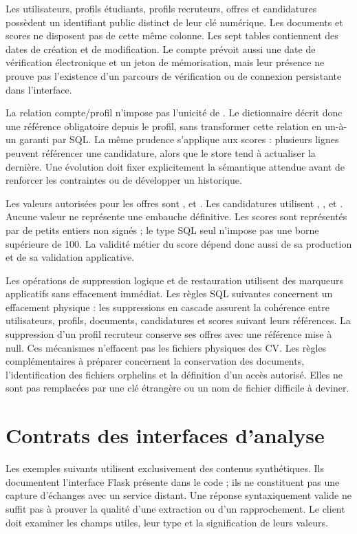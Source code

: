 Les utilisateurs, profils étudiants, profils recruteurs, offres et candidatures possèdent un identifiant public distinct de leur clé numérique. Les documents et scores ne disposent pas de cette même colonne. Les sept tables contiennent des dates de création et de modification. Le compte prévoit aussi une date de vérification électronique et un jeton de mémorisation, mais leur présence ne prouve pas l'existence d'un parcours de vérification ou de connexion persistante dans l'interface.

La relation compte/profil n'impose pas l'unicité de . Le dictionnaire décrit donc une référence obligatoire depuis le profil, sans transformer cette relation en un-à-un garanti par SQL. La même prudence s'applique aux scores : plusieurs lignes peuvent référencer une candidature, alors que le store tend à actualiser la dernière. Une évolution doit fixer explicitement la sémantique attendue avant de renforcer les contraintes ou de développer un historique.

Les valeurs autorisées pour les offres sont ,  et . Les candidatures utilisent , ,  et . Aucune valeur ne représente une embauche définitive. Les scores sont représentés par de petits entiers non signés ; le type SQL seul n'impose pas une borne supérieure de 100. La validité métier du score dépend donc aussi de sa production et de sa validation applicative.

Les opérations de suppression logique et de restauration utilisent des marqueurs applicatifs sans effacement immédiat. Les règles SQL suivantes concernent un effacement physique : les suppressions en cascade assurent la cohérence entre utilisateurs, profils, documents, candidatures et scores suivant leurs références. La suppression d'un profil recruteur conserve ses offres avec une référence mise à null. Ces mécanismes n'effacent pas les fichiers physiques des CV. Les règles complémentaires à préparer concernent la conservation des documents, l'identification des fichiers orphelins et la définition d'un accès autorisé. Elles ne sont pas remplacées par une clé étrangère ou un nom de fichier difficile à deviner.

\chapter{Contrats des interfaces d'analyse}
\label{ann:api}

Les exemples suivants utilisent exclusivement des contenus synthétiques. Ils documentent l'interface Flask présente dans le code ; ils ne constituent pas une capture d'échanges avec un service distant. Une réponse syntaxiquement valide ne suffit pas à prouver la qualité d'une extraction ou d'un rapprochement. Le client doit examiner les champs utiles, leur type et la signification de leurs valeurs.

